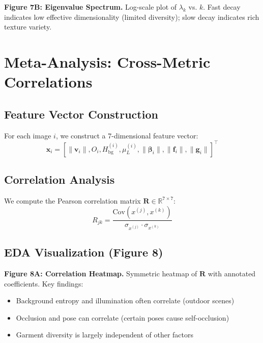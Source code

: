 \documentclass[runningheads]{llncs}
\newcommand{\R}{\mathbb{R}}
\newcommand{\bvec}[1]{\bm{#1}}
\begin{document}
\textbf{Figure 7B: Eigenvalue Spectrum.} Log-scale plot of $\lambda_k$ vs. $k$. Fast decay indicates low effective dimensionality (limited diversity); slow decay indicates rich texture variety.


\section{Meta-Analysis: Cross-Metric Correlations}
\label{sec:m8_meta}

\subsection{Feature Vector Construction}

For each image $i$, we construct a 7-dimensional feature vector:
\begin{equation}
    \bvec{x}_i = \left[\|\bvec{v}_i\|, O_i, H_{\text{bg}}^{(i)}, \mu_L^{(i)}, \|\bvec{\beta}_i\|, \|\bvec{f}_i\|, \|\bvec{g}_i\|\right]^\top
\end{equation}

\subsection{Correlation Analysis}

We compute the Pearson correlation matrix $\bvec{R} \in \R^{7 \times 7}$:
\begin{equation}
    R_{jk} = \frac{\text{Cov}(x^{(j)}, x^{(k)})}{\sigma_{x^{(j)}} \cdot \sigma_{x^{(k)}}}
\end{equation}

\subsection{EDA Visualization (Figure 8)}

\textbf{Figure 8A: Correlation Heatmap.} Symmetric heatmap of $\bvec{R}$ with annotated coefficients. Key findings:
\begin{itemize}
    \item Background entropy and illumination often correlate (outdoor scenes)
    \item Occlusion and pose can correlate (certain poses cause self-occlusion)
    \item Garment diversity is largely independent of other factors
\end{itemize}
\end{document}
